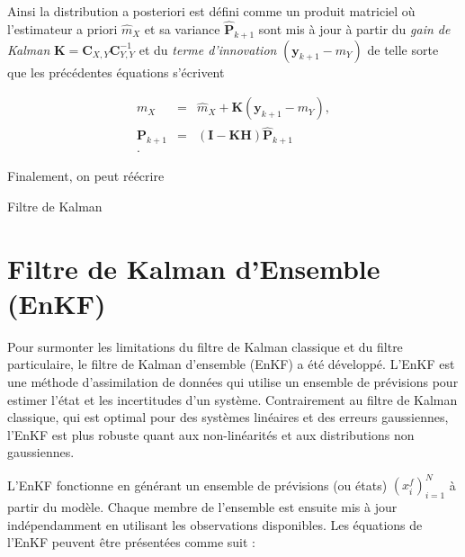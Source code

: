 Ainsi la distribution a posteriori est défini comme un produit matriciel où l'estimateur a priori $\hat m_X$ et sa variance $\hat{\bm  P}_{k+1}$ sont mis à jour à partir du \textit{gain de Kalman} $\bm K = \bm C_{X,Y} \bm C_{Y,Y}^{-1} $ et du \textit{terme d'innovation} $(\bm y_{k+1} - m_Y)$ de telle sorte que les précédentes équations s'écrivent

\begin{eqnarray*}
    m_X &=& \hat m_X + \bm K (\bm y_{k+1} - m_Y), \\
    \bm P_{k+1} &=& (\bm I - \bm K\bm H)\hat{\bm  P}_{k+1} \\.
\end{eqnarray*}

Finalement, on peut réécrire
\begin{algorithm}
    \caption{Filtre de Kalman}
\end{algorithm}

\section{Filtre de Kalman d'Ensemble (EnKF)}

Pour surmonter les limitations du filtre de Kalman classique et du filtre particulaire, le filtre de Kalman d'ensemble (EnKF) a été développé. L'EnKF est une méthode d'assimilation de données qui utilise un ensemble de prévisions pour estimer l'état et les incertitudes d'un système. Contrairement au filtre de Kalman classique, qui est optimal pour des systèmes linéaires et des erreurs gaussiennes, l'EnKF est plus robuste quant aux non-linéarités et aux distributions non gaussiennes.

L'EnKF fonctionne en générant un ensemble de prévisions  (ou états) $(x_i^f)_{i=1}^N$ à partir du modèle. Chaque membre de l'ensemble est ensuite mis à jour indépendamment en utilisant les observations disponibles. Les équations de l'EnKF peuvent être présentées comme suit :

